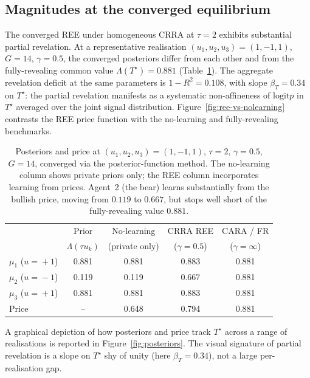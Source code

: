 \documentclass[12pt,letterpaper]{article}
\theoremstyle{definition}
\theoremstyle{remark}
\newcommand{\Lam}{\Lambda}            %
\newcommand{\logit}{\mathrm{logit}}
\newcommand{\Tstar}{T^{\!\star}}
\newcommand{\1}{\mathbf{1}}
\begin{document}
\subsection{Magnitudes at the converged equilibrium}\label{sec:posteriors}

The converged REE under homogeneous CRRA at $\tau=2$ exhibits substantial
partial revelation. At a representative realisation
$(u_{1},u_{2},u_{3})=(1,-1,1)$, $G=14$, $\gamma=0.5$, the converged
posteriors differ from each other and from the fully-revealing common
value $\Lam(\Tstar)=0.881$ (Table~\ref{tab:posteriors}). The aggregate
revelation deficit at the same parameters is $1-R^{2}=0.108$, with
slope $\beta_{T}=0.34$ on $\Tstar$: the partial revelation manifests as a
systematic non-affineness of $\logit p$ in $\Tstar$ averaged over the
joint signal distribution. Figure~\ref{fig:ree-vs-nolearning}
contrasts the REE price function with the no-learning and
fully-revealing benchmarks.

\begin{table}[htbp]
   \centering
   \caption{Posteriors and price at $(u_{1},u_{2},u_{3})=
   (1,-1,1)$, $\tau=2$, $\gamma=0.5$, $G=14$, converged via the
   posterior-function method. The no-learning column shows private priors
   only; the REE column incorporates learning from prices. Agent~2 (the
   bear) learns substantially from the bullish price, moving from $0.119$
   to $0.667$, but stops well short of the fully-revealing value $0.881$.}
   \label{tab:posteriors}
   \begin{tabular}{lcccc}
      \toprule
       & Prior & No-learning & CRRA REE & CARA / FR \\
       & $\Lam(\tau u_{k})$ & (private only) & ($\gamma\!=\!0.5$) & ($\gamma\!=\!\infty$) \\
      \midrule
      $\mu_{1}$ ($u\!=\!+1$) & 0.881 & 0.881 & 0.883 & 0.881 \\
      $\mu_{2}$ ($u\!=\!-1$) & 0.119 & 0.119 & 0.667 & 0.881 \\
      $\mu_{3}$ ($u\!=\!+1$) & 0.881 & 0.881 & 0.883 & 0.881 \\
      Price                  & --    & 0.648 & 0.794 & 0.881 \\
      \bottomrule
   \end{tabular}
\end{table}

A graphical depiction of how posteriors and price track $\Tstar$ across
a range of realisations is reported in Figure~\ref{fig:posteriors}.
The visual signature of partial revelation is a slope on $\Tstar$
shy of unity (here $\beta_{T}=0.34$), not a large per-realisation
gap.
\end{document}
